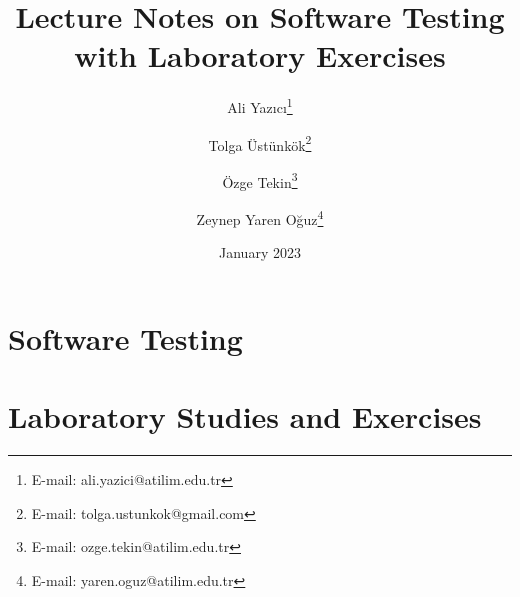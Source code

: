\documentclass[paper=b5,fontsize=10,parskip=full,pagesize=auto,headsepline=true,chapterprefix=true,BCOR=18mm,DIV=15,listof=flat,twosides]{scrbook}
\begin{document}
    \titlehead{Atılım University\\Department of Software Engineering}
    \title{Lecture Notes on Software Testing with Laboratory Exercises}
    \author{Ali Yazıcı\thanks{E-mail: ali.yazici@atilim.edu.tr} \and Tolga Üstünkök\thanks{E-mail: tolga.ustunkok@gmail.com} \and Özge Tekin\thanks{E-mail: ozge.tekin@atilim.edu.tr} \and Zeynep Yaren Oğuz\thanks{E-mail: yaren.oguz@atilim.edu.tr}}
    \date{January 2023}
    \publishers{Department of Software Engineering\\Atılım University}
    \lowertitleback{This lab manual was set with the help of {\KOMAScript} and {\LaTeX} and last compiled on {\today}. The document source can be found in \url{https://github.com/tustunkok/se344-lab-manual}.}
    \maketitle
    
    \frontmatter
    \tableofcontents
    \listoffigures
    \listoftables
    \lstlistoflistings
    
    \mainmatter
    \part{Software Testing}
    
    
    
    
    
    
    
    
    
    
    \part{Laboratory Studies and Exercises}
    
    
    
    
    
    
    
    
    
    \appendix
    
    
    
    \backmatter
    \printbibliography[heading=bibintoc]
    \printindex
\end{document}
